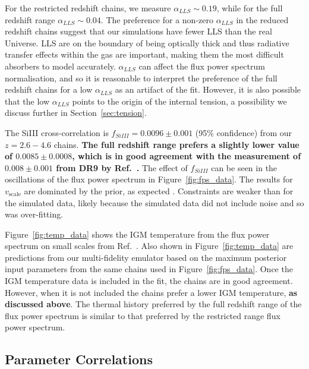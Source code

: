 For the restricted redshift chains, we measure $\alpha_{LLS} \sim 0.19$, while for the full redshift range $\alpha_{LLS} \sim 0.04$.
The preference for a non-zero $\alpha_{LLS}$ in the reduced redshift chains suggest that our simulations have fewer LLS than the real Universe.
LLS are on the boundary of being optically thick and thus radiative transfer effects within the gas are important, making them the most difficult absorbers to model accurately.
$\alpha_{LLS}$ can affect the flux power spectrum normalisation, and so it is reasonable to interpret the preference of the full redshift chains for a low $\alpha_{LLS}$ as an artifact of the fit.
However, it is also possible that the low $\alpha_{LLS}$ points to the origin of the internal tension, a possibility we discuss further in Section~\ref{sec:tension}. 

The SiIII cross-correlation is $f_{SiIII} = 0.0096 \pm 0.001$ (95\% confidence) from our $z=2.6 - 4.6$ chains.
\textbf{The full redshift range prefers a slightly lower value of $0.0085 \pm 0.0008$, which is in good agreement with the measurement of $0.008 \pm 0.001$ from DR9 by Ref.~\cite{2013A&A...559A..85P}.}
The effect of $f_{SiIII}$ can be seen in the oscillations of the flux power spectrum in Figure~\ref{fig:fps_data}.
The results for $v_\mathrm{scale}$ are dominated by the prior, as expected \cite{2015JCAP...11..011P, 2020JCAP...04..038P}.
Constraints are weaker than for the simulated data, likely because the simulated data did not include noise and so was over-fitting.

Figure~\ref{fig:temp_data} shows the IGM temperature from the flux power spectrum on small scales from Ref.~\cite{2021MNRAS.506.4389G}.
Also shown in Figure~\ref{fig:temp_data} are predictions from our multi-fidelity emulator based on the maximum posterior input parameters from the same chains used in Figure~\ref{fig:fps_data}.
Once the IGM temperature data is included in the fit, the chains are in good agreement.
However, when it is not included the chains prefer a lower IGM temperature, \textbf{as discussed above}.
The thermal history preferred by the full redshift range of the flux power spectrum is similar to that preferred by the restricted range flux power spectrum.

\subsection{Parameter Correlations}
\label{sec:correlations}

